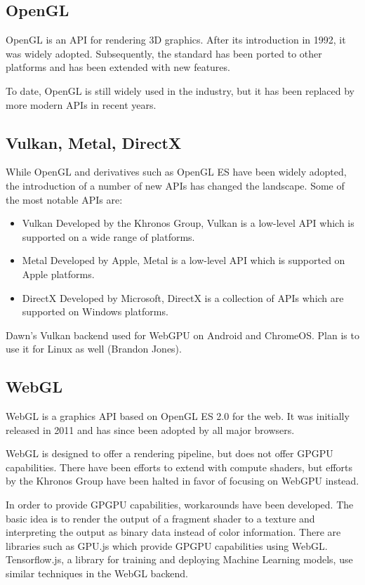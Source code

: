\subsection{OpenGL}

OpenGL is an \gls{API} for rendering 3D graphics. After its introduction in 1992, it was widely adopted. Subsequently, the standard has been ported to other platforms and has been extended with new features.

To date, OpenGL is still widely used in the industry, but it has been replaced by more modern \gls{API}s in recent years.

\subsection{Vulkan, Metal, DirectX}

While OpenGL and derivatives such as OpenGL ES have been widely adopted, the introduction of a number of new \gls{API}s has changed the landscape. Some of the most notable \gls{API}s are:

\begin{itemize}
    \item{Vulkan} Developed by the Khronos Group, Vulkan is a low-level \gls{API} which is supported on a wide range of platforms.
    \item{Metal} Developed by Apple, Metal is a low-level \gls{API} which is supported on Apple platforms.
    \item{DirectX} Developed by Microsoft, DirectX is a collection of \gls{API}s which are supported on Windows platforms.
\end{itemize}

Dawn's Vulkan backend used for WebGPU on Android and ChromeOS. Plan is to use it for Linux as well (Brandon Jones).

\subsection{WebGL}

WebGL is a graphics \gls{API} based on OpenGL ES 2.0 for the web. It was initially released in 2011 and has since been adopted by all major browsers.

WebGL is designed to offer a rendering pipeline, but does not offer GPGPU capabilities. There have been efforts to extend with compute shaders, but efforts by the Khronos Group have been halted in favor of focusing on WebGPU instead.

In order to provide GPGPU capabilities, workarounds have been developed. The basic idea is to render the output of a fragment shader to a texture and interpreting the output as binary data instead of color information.
There are libraries such as GPU.js which provide GPGPU capabilities using WebGL. Tensorflow.js, a library for training and deploying Machine Learning models, use similar techniques in the WebGL backend.

